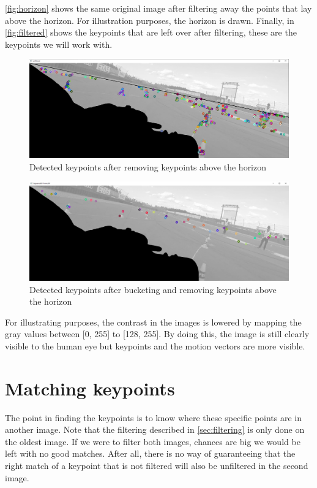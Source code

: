 \autoref{fig:horizon} shows the same original image after filtering away the points that lay above the horizon. For illustration purposes, the horizon is drawn. Finally, in \autoref{fig:filtered} shows the keypoints that are left over after filtering, these are the keypoints we will work with.\bigskip

\begin{figure}
    \centering
    \includegraphics[width=1\textwidth]{figures/Horizon_filtered.png}
    \caption{Detected keypoints after removing keypoints above the horizon}
    \label{fig:horizon}
\end{figure}
\begin{figure}
    \centering
    \includegraphics[width=1\textwidth]{figures/Filtered_keypoints.png}
    \caption{Detected keypoints after bucketing and removing keypoints above the horizon}
    \label{fig:filtered}
\end{figure}

For illustrating purposes, the contrast in the images is lowered by mapping the gray values between [0, 255] to [128, 255]. By doing this, the image is still clearly visible to the human eye but keypoints and the motion vectors are more visible.

\section{Matching keypoints}
The point in finding the keypoints is to know where these specific points are in another image. Note that the filtering described in \autoref{sec:filtering} is only done on the oldest image. If we were to filter both images, chances are big we would be left with no good matches. After all, there is no way of guaranteeing that the right match of a keypoint that is not filtered will also be unfiltered in the second image.\bigskip

